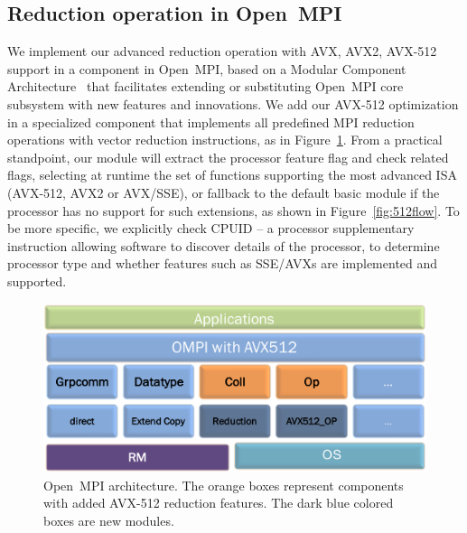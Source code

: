 \documentclass[5p,times,twocolumn]{elsarticle}
\newcommand{\ompi}[0]{Open~MPI\xspace}
\begin{document}
\subsection{Reduction operation in \ompi}
We implement our advanced reduction operation with AVX, AVX2, AVX-512
support in a component in \ompi, based on a Modular Component
Architecture~\cite{dongprrte} that facilitates extending or
substituting \ompi core subsystem with new features and innovations.
We add our AVX-512 optimization in a specialized component that
implements all predefined MPI reduction operations with vector
reduction instructions, as in Figure~\ref{fig:avxmca}. From a
practical standpoint, our module will extract the processor
feature flag and check related flags, selecting at runtime the set of
functions supporting the most advanced ISA (AVX-512, AVX2 or AVX/SSE),
or fallback to the default basic module if the processor has no
support for such extensions, as shown in Figure~\ref{fig:512flow}.
%
To be more specific, we explicitly check CPUID -- a processor
supplementary instruction allowing software to discover details of the
processor, to determine processor type and whether features such as
SSE/AVXs are implemented and supported.

\begin{figure}[h]
    \centering
    \includegraphics[width=\linewidth]{avx-mca.pdf}
    \caption{\ompi architecture. The orange boxes represent components with added AVX-512 reduction features. The dark blue colored boxes are new modules.}
    \label{fig:avxmca}
\end{figure}
\end{document}
